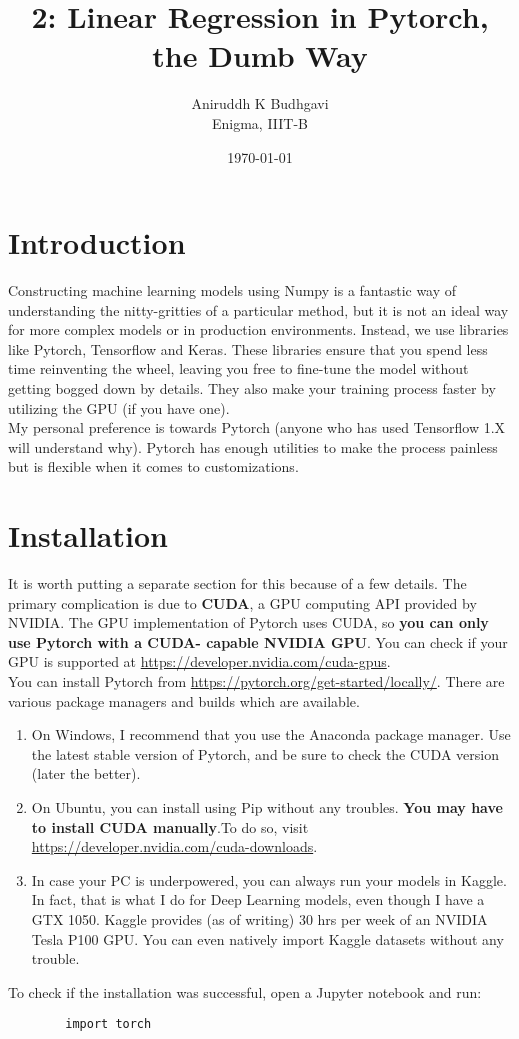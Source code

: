 \documentclass{article}
\title{2: Linear Regression in Pytorch, the Dumb Way}
\date{\today}
\author{Aniruddh K Budhgavi \\Enigma, IIIT-B}
\begin{document}
    \maketitle 
    \section{Introduction}
    Constructing machine learning models using Numpy is a fantastic way 
    of understanding the nitty-gritties of a particular method, but it is 
    not an ideal way for more complex models or in production environments.
    Instead, we use libraries like Pytorch, Tensorflow and Keras. These libraries
    ensure that you spend less time reinventing the wheel, leaving you free to fine-tune
    the model without getting bogged down by details. They also make your training process
    faster by utilizing the GPU (if you have one).
    \\
    My personal preference is towards Pytorch (anyone who has used Tensorflow 
    1.X will understand why). Pytorch has enough utilities to make the process painless
    but is flexible when it comes to customizations.
    \section{Installation}
    It is worth putting a separate section for this because of a few details. The primary
    complication is due to \textbf{CUDA}, a GPU computing API provided by NVIDIA. The GPU 
    implementation of Pytorch uses CUDA, so \textbf{you can only use Pytorch with a CUDA-
    capable NVIDIA GPU}. You can check if your GPU is supported at \url{https://developer.nvidia.com/cuda-gpus}.
    \\
    You can install Pytorch from \url{https://pytorch.org/get-started/locally/}. There are 
    various package managers and builds which are available.
    \begin{enumerate}
        \item On Windows, I recommend that you use the Anaconda package manager. Use the latest 
            stable version of Pytorch, and be sure to check the CUDA version (later the better).
        \item On Ubuntu, you can install using Pip without any troubles. \textbf{You may have to
        install CUDA manually}.To do so, visit \url{https://developer.nvidia.com/cuda-downloads}.
        \item In case your PC is underpowered, you can always run your models in Kaggle.
        In fact, that is what I do for Deep Learning models, even though I have a GTX 1050. 
        Kaggle provides (as of writing) 30 hrs per week of an NVIDIA Tesla P100 GPU. 
        You can even natively import Kaggle datasets without any trouble.
    \end{enumerate}
    To check if the installation was successful, open a Jupyter notebook and run:
    \begin{verbatim}
        import torch
    \end{verbatim}
\end{document}
